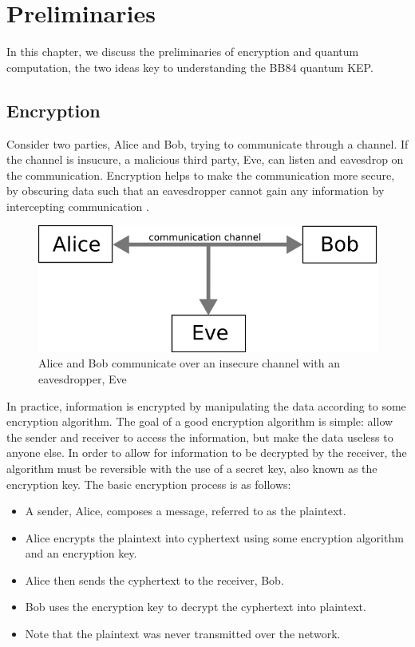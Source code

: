 \chapter{Preliminaries}
\label{chap:background}

In this chapter, we discuss the preliminaries of encryption and quantum computation, the two ideas key to understanding the BB84 quantum KEP.


\section{Encryption}
Consider two parties, Alice and Bob, trying to communicate through a channel.
If the channel is insucure, a malicious third party, Eve, can listen and eavesdrop on the communication.
Encryption helps to make the communication more secure, by obscuring data such that an eavesdropper cannot gain any information by intercepting communication \cite{encrypt}.

\begin{figure}[htp]
\centering
\includegraphics[scale=0.4]{images/classical_communication.png}
\caption{Alice and Bob communicate over an insecure channel with an eavesdropper, Eve}
\label{foo bar}
\end{figure}

In practice, information is encrypted by manipulating the data according to some encryption algorithm.
The goal of a good encryption algorithm is simple: allow the sender and receiver to access the information, but make the data useless to anyone else.
In order to allow for information to be decrypted by the receiver, the algorithm must be reversible with the use of a secret key, also known as the encryption key.
The basic encryption process is as follows:

\begin{itemize}
\item A sender, Alice, composes a message, referred to as the plaintext.
\item Alice encrypts the plaintext into cyphertext using some encryption algorithm and an encryption key.
\item Alice then sends the cyphertext to the receiver, Bob.
\item Bob uses the encryption key to decrypt the cyphertext into plaintext.
\item Note that the plaintext was never transmitted over the network.
\end{itemize}

